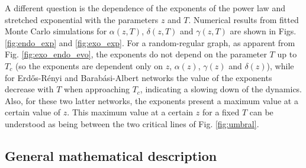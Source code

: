 
A different question is the dependence of the exponents of the power law and stretched exponential with the parameters $z$ and $T$. Numerical results from fitted Monte Carlo simulations for $\alpha(z,T)$, $\delta(z,T)$ and $\gamma(z,T)$ are shown in Figs. \ref{fig:endo_exp} and \ref{fig:exo_exp}. For a random-regular graph, as apparent from Fig. \ref{fig:exo_endo_evo}, the exponents do not depend on the parameter $T$ up to $T_c$ (so the exponents are dependent only on $z$, $\alpha(z)$, $\gamma(z)$ and $\delta(z)$), while for Erd\H{o}s-R\'enyi and Barab\'asi-Albert networks the value of the exponents decrease with $T$ when approaching $T_c$, indicating a slowing down of the dynamics. Also, for these two latter networks, the exponents present a maximum value at a certain value of $z$. This maximum value at a certain $z$ for a fixed $T$ can be understood as being between the two critical lines of Fig. \ref{fig:umbral}.

\subsection{\label{subsec:Approximate master equation and solutions} General mathematical description}

